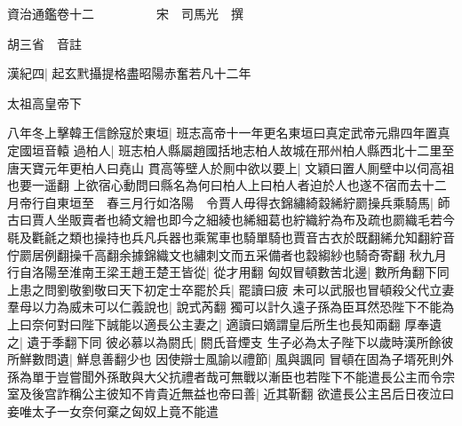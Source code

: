 






























































資治通鑑卷十二　　　　　宋　司馬光　撰

胡三省　音註

漢紀四|{
	起玄黓攝提格盡昭陽赤奮若凡十二年}


太祖高皇帝下

八年冬上擊韓王信餘寇於東垣|{
	班志高帝十一年更名東垣曰真定武帝元鼎四年置真定國垣音轅}
過柏人|{
	班志柏人縣屬趙國括地志柏人故城在邢州柏人縣西北十二里至唐天寶元年更柏人曰堯山}
貫高等壁人於厠中欲以要上|{
	文穎曰置人厠壁中以伺高祖也要一遥翻}
上欲宿心動問曰縣名為何曰柏人上曰柏人者迫於人也遂不宿而去十二月帝行自東垣至　春三月行如洛陽　令賈人毋得衣錦繡綺縠絺紵罽操兵乘騎馬|{
	師古曰賈人坐販賣者也綺文繒也即今之細綾也絺細葛也紵織紵為布及疏也罽織毛若今毼及氍毹之類也操持也兵凡兵器也乘駕車也騎單騎也賈音古衣於既翻絺允知翻紵音佇罽居例翻操千高翻余據錦織文也繡刺文而五采備者也縠縐紗也騎奇寄翻}
秋九月行自洛陽至淮南王梁王趙王楚王皆從|{
	從才用翻}
匈奴冒頓數苦北邊|{
	數所角翻下同}
上患之問劉敬劉敬曰天下初定士卒罷於兵|{
	罷讀曰疲}
未可以武服也冒頓殺父代立妻羣母以力為威未可以仁義說也|{
	說式芮翻}
獨可以計久遠子孫為臣耳然恐陛下不能為上曰奈何對曰陛下誠能以適長公主妻之|{
	適讀曰嫡謂皇后所生也長知兩翻}
厚奉遺之|{
	遺于季翻下同}
彼必慕以為閼氏|{
	閼氏音煙支}
生子必為太子陛下以歲時漢所餘彼所鮮數問遺|{
	鮮息善翻少也}
因使辯士風諭以禮節|{
	風與諷同}
冒頓在固為子壻死則外孫為單于豈嘗聞外孫敢與大父抗禮者哉可無戰以漸臣也若陛下不能遣長公主而令宗室及後宫詐稱公主彼知不肯貴近無益也帝曰善|{
	近其靳翻}
欲遣長公主呂后日夜泣曰妾唯太子一女奈何棄之匈奴上竟不能遣

